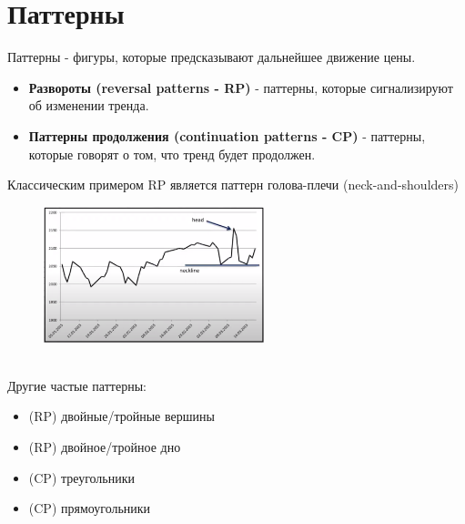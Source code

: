 \documentclass{article}
\begin{document}
\section{Паттерны}
Паттерны - фигуры, которые предсказывают дальнейшее движение цены.
\begin{itemize}
    \item \textbf{Развороты (reversal patterns - RP)} - паттерны, которые сигнализируют об изменении тренда.

    \item \textbf{Паттерны продолжения (continuation patterns - CP)} - паттерны, которые говорят о том, что тренд будет продолжен.
\end{itemize}
Классическим примером RP является паттерн голова-плечи (neck-and-shoulders)\\
\begin{figure}[h]
\centering
\includegraphics[width=0.57\textwidth]{patterns.png}
\label{loadings}
\end{figure}
\\Другие частые паттерны:
\begin{itemize}
    \item (RP) двойные/тройные вершины
    \item (RP) двойное/тройное дно
    \item (CP) треугольники
    \item (CP) прямоугольники
\end{itemize}
\end{document}

